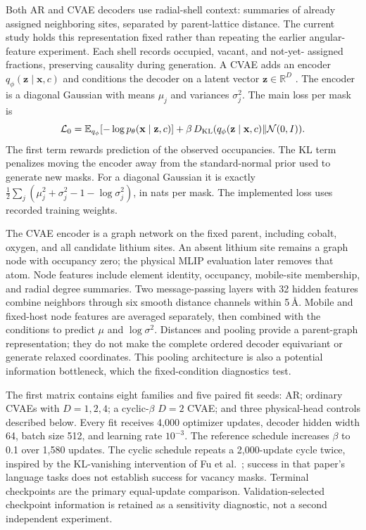 \documentclass[11pt]{article}
\newcommand{\E}{\mathbb E}
\newcommand{\KL}{D_{\rm KL}}
\begin{document}
Both AR and CVAE decoders use radial-shell context: summaries of already
assigned neighboring sites, separated by parent-lattice distance. The current
study holds this representation fixed rather than repeating the earlier
angular-feature experiment. Each shell records occupied, vacant, and not-yet-
assigned fractions, preserving causality during generation. A CVAE adds an encoder
$q_\phi(\mathbf z\mid\mathbf x,c)$ and conditions the decoder on a latent
vector $\mathbf z\in\mathbb R^D$ \cite{kingma}. The encoder is a diagonal
Gaussian with means $\mu_j$ and variances $\sigma_j^2$. The main loss per mask
is
\begin{equation}
\mathcal L_0=
\E_{q_\phi}[-\log p_\theta(\mathbf x\mid\mathbf z,c)]
+\beta\,\KL(q_\phi(\mathbf z\mid\mathbf x,c)\|\mathcal N(0,I)).
\label{eq:loss}
\end{equation}
The first term rewards prediction of the observed occupancies. The KL term
penalizes moving the encoder away from the standard-normal prior used to
generate new masks. For a diagonal Gaussian it is exactly
$\tfrac12\sum_j(\mu_j^2+\sigma_j^2-1-\log\sigma_j^2)$, in nats per mask.
The implemented loss uses recorded training weights.

The CVAE encoder is a graph network on the fixed parent, including cobalt,
oxygen, and all candidate lithium sites. An absent lithium site remains a
graph node with occupancy zero; the physical MLIP evaluation later removes
that atom. Node features include element identity, occupancy, mobile-site
membership, and radial degree summaries. Two message-passing layers with
32 hidden features combine neighbors through six smooth distance channels
within 5\,\AA. Mobile and fixed-host node features are averaged separately,
then combined with the conditions to predict $\mu$ and $\log\sigma^2$.
Distances and pooling provide a parent-graph representation; they do not
make the complete ordered decoder equivariant or generate relaxed
coordinates. This pooling architecture is also a potential information
bottleneck, which the fixed-condition diagnostics test.

The first matrix contains eight families and five paired fit seeds: AR;
ordinary CVAEs with $D=1,2,4$; a cyclic-$\beta$ $D=2$ CVAE; and three
physical-head controls described below. Every fit receives 4,000 optimizer
updates, decoder hidden width 64, batch size 512, and learning rate $10^{-3}$. The
reference schedule increases $\beta$ to 0.1 over 1,580 updates. The cyclic
schedule repeats a 2,000-update cycle twice, inspired by the KL-vanishing
intervention of Fu et al.\ \cite{fu}; success in that paper's language tasks
does not establish success for vacancy masks. Terminal checkpoints are the
primary equal-update comparison. Validation-selected checkpoint information
is retained as a sensitivity diagnostic, not a second independent experiment.
\end{document}
